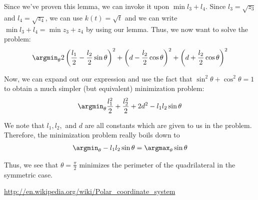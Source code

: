 \documentclass[12pt]{amsart}   %
\begin{document}
Since we've proven this lemma, we can invoke it upon $\min l_3 + l_4$. Since $l_3 = \sqrt{z_3}$ and $l_4 = \sqrt{z_4}$, we can use $k(t) = \sqrt{t}$ and we can write $\min l_3 + l_4 = \min z_3 + z_4$ by using our lemma. Thus, we now want to solve the problem:
\begin{eqnarray}
  \argmin_{\theta} 2 \left(\frac{l_1}{2} - \frac{l_2}{2} \sin \theta \right)^2 + \left( d - \frac{l_2}{2} \cos \theta \right)^2 + \left( d + \frac{l_2}{2} \cos \theta \right)^2
\end{eqnarray}

Now, we can expand out our expression and use the fact that $\sin^2 \theta + \cos^2 \theta = 1$ to obtain a much simpler (but equivalent) minimization problem:
\begin{eqnarray}
  \argmin_{\theta} \frac{l_1^2}{2} + \frac{l_2^2}{2} + 2d^2 - l_1 l_2 \sin \theta
\end{eqnarray}

We note that $l_1, l_2,$ and $d$ are all constants which are given to us in the problem. Therefore, the minimization problem really boils down to
\begin{eqnarray}
  \argmin_{\theta} - l_1 l_2 \sin \theta = \argmax_{\theta} \sin \theta
\end{eqnarray}

Thus, we see that $\theta = \frac{\pi}{2}$ minimizes the perimeter of the quadrilateral in the symmetric case.


\begin{thebibliography}{9}
\url{http://en.wikipedia.org/wiki/Polar_coordinate_system}
\end{thebibliography}
\end{document}

